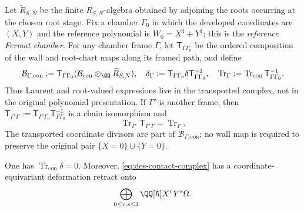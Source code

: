 Let $\widetilde R_{S,N}$ be the finite $R_{S,N}$-algebra obtained by
adjoining the roots occurring at the chosen root stage.  Fix a chamber
$\Gamma_0$ in which the developed coordinates are $(X,Y)$ and the reference
polynomial is $W_0=X^4+Y^4$; this is the \emph{reference Fermat chamber}.
For any chamber frame $\Gamma$, let
$\mathsf T_{\Gamma\Gamma_0}$ be the ordered composition of the wall and
root-chart maps along its framed path, and define
\begin{equation}
 \mathcal B_{\Gamma,\mathrm{con}}
 :=\mathsf T_{\Gamma\Gamma_0}
   (\mathcal B_{\mathrm{con}}\otimes_{\QQ}
    \widetilde R_{S,N}),\quad
 \delta_\Gamma:=\mathsf T_{\Gamma\Gamma_0}\delta
  \mathsf T_{\Gamma\Gamma_0}^{-1},\quad
 \operatorname{Tr}_\Gamma:=\operatorname{Tr}_{\mathrm{con}}
  \mathsf T_{\Gamma\Gamma_0}^{-1}.
 \label{eq:des-transported-contact-complex}
\end{equation}
Thus Laurent and root-valued expressions live in the transported complex,
not in the original polynomial presentation.  If $\Gamma'$ is another
frame, then
$\mathsf T_{\Gamma'\Gamma}:=\mathsf T_{\Gamma'\Gamma_0}
\mathsf T_{\Gamma\Gamma_0}^{-1}$ is a chain isomorphism and
\begin{equation}
 \operatorname{Tr}_{\Gamma'}\mathsf T_{\Gamma'\Gamma}
 =\operatorname{Tr}_\Gamma.
 \label{eq:des-trace-transport}
\end{equation}
The transported coordinate divisors are part of
$\mathcal B_{\Gamma,\mathrm{con}}$; no wall map is required to preserve the
original pair $\{X=0\}\cup\{Y=0\}$.

\begin{proposition}
\label{prop:des-contact-stokes}
One has $\operatorname{Tr}_{\mathrm{con}}\delta=0$.  Moreover,
\eqref{eq:des-contact-complex} has a coordinate-equivariant deformation
retract onto
\begin{equation}
 \bigoplus_{0\leq r,s\leq3}\QQ[\hbar]X^rY^s\Omega.
 \label{eq:des-relative-normal-form}
\end{equation}
\end{proposition}

